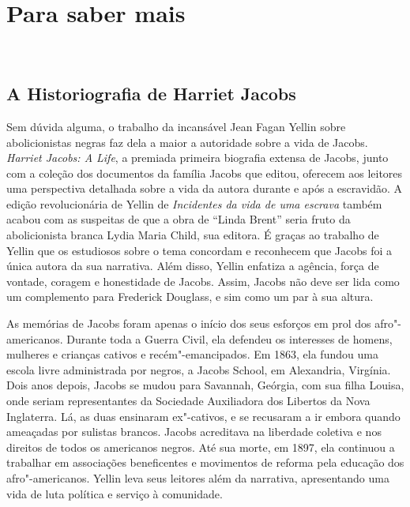 \chapter*{Para saber mais} %

\begin{flushright}
\\\vspace{-3pt}
\end{flushright}




\section{A Historiografia de Harriet Jacobs}

Sem dúvida alguma, o trabalho da incansável Jean Fagan Yellin sobre
abolicionistas negras faz dela a maior a autoridade sobre a vida de
Jacobs. \emph{Harriet Jacobs: A Life}, a premiada primeira biografia
extensa de Jacobs, junto com a coleção dos documentos da família Jacobs
que editou, oferecem aos leitores uma perspectiva detalhada sobre a vida
da autora durante e após a escravidão. A edição revolucionária de Yellin
de \emph{Incidentes da vida de uma escrava} também acabou com as
suspeitas de que a obra de ``Linda Brent'' seria fruto da abolicionista
branca Lydia Maria Child, sua editora. É graças ao trabalho de Yellin
que os estudiosos sobre o tema concordam e reconhecem que Jacobs foi a
única autora da sua narrativa. Além disso, Yellin enfatiza a agência,
força de vontade, coragem e honestidade de Jacobs. Assim, Jacobs não
deve ser lida como um complemento para Frederick Douglass, e sim como um
par à sua altura.

As memórias de Jacobs foram apenas o início dos seus esforços em prol
dos afro"-americanos. Durante toda a Guerra Civil, ela defendeu os
interesses de homens, mulheres e crianças cativos e
recém"-emancipados. Em 1863, ela fundou uma escola livre administrada por
negros, a Jacobs School, em Alexandria, Virgínia. Dois anos depois,
Jacobs se mudou para Savannah, Geórgia, com sua filha Louisa, onde
seriam representantes da Sociedade Auxiliadora dos Libertos da Nova
Inglaterra. Lá, as duas ensinaram ex"-cativos, e se recusaram a ir
embora quando ameaçadas por sulistas brancos. Jacobs acreditava na
liberdade coletiva e nos direitos de todos os americanos negros. Até sua
morte, em 1897, ela continuou a trabalhar em associações beneficentes e
movimentos de reforma pela educação dos afro"-americanos. Yellin leva
seus leitores além da narrativa, apresentando uma vida de luta política e
serviço à comunidade.


